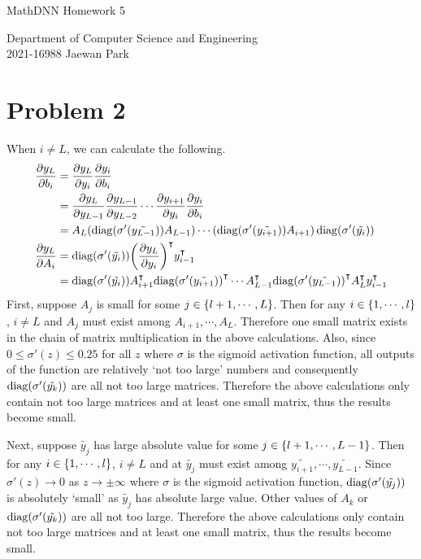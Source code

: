 \documentclass[10pt]{article}
\begin{document}
\begin{center}
    {\LARGE MathDNN Homework 5} \\
\end{center}
\begin{flushright}
    Department of Computer Science and Engineering \\
    2021-16988 Jaewan Park
\end{flushright}

\section*{Problem 2}
When $i \neq L$, we can calculate the following.
\begin{align*}
    \frac{\partial y_L}{\partial b_i} &= \frac{\partial y_L}{\partial y_i}\frac{\partial y_i}{\partial b_i} \\
    &= \frac{\partial y_L}{\partial y_{L-1}}\frac{\partial y_{L-1}}{\partial y_{L-2}}\cdots\frac{\partial y_{i+1}}{\partial y_i}\frac{\partial y_{i}}{\partial b_i} \\
    &= A_L\qty(\mathrm{diag}\qty(\sigma'(\tilde{y_{L-1}}))A_{L-1})\cdots\qty(\mathrm{diag}\qty(\sigma'(\tilde{y_{i+1}}))A_{i+1})\,\mathrm{diag}\qty(\sigma'(\tilde{y_i})) \\
    \frac{\partial y_L}{\partial A_i} &= \mathrm{diag}\qty(\sigma'(\tilde{y_i}))\qty(\frac{\partial y_L}{\partial y_i})^\intercal y_{i-1}^\intercal \\
    &= \mathrm{diag}\qty(\sigma'(\tilde{y_i}))A_{i+1}^\intercal\mathrm{diag}\qty(\sigma'(\tilde{y_{i+1}}))^\intercal\cdots A_{L-1}^\intercal\mathrm{diag}\qty(\sigma'\qty(\tilde{y_{L-1}}))^\intercal A_L^\intercal y_{i-1}^\intercal
\end{align*}
First, suppose $A_j$ is small for some $j \in \qty{l+1, \cdots , L}$.
Then for any $i \in \qty{1, \cdots , l}$, $i \neq L$ and $A_j$ must exist among $A_{i+1}, \cdots , A_L$.
Therefore one small matrix exists in the chain of matrix multiplication in the above calculations. 
Also, since $0 \leq \sigma'(z) \leq 0.25$ for all $z$ where $\sigma$ is the sigmoid activation function, all outputs of the function are relatively `not too large' numbers and consequently $\mathrm{diag}\qty(\sigma'\qty(\tilde{y_k}))$ are all not too large matrices.
Therefore the above calculations only contain not too large matrices and at least one small matrix, thus the results become small.

\vspace{3mm}
Next, suppose $\tilde{y_j}$ has large absolute value for some $j \in \qty{l+1, \cdots , L-1}$.
Then for any $i \in \qty{1, \cdots , l}$, $i \neq L$ and at $\tilde{y_j}$ must exist among $\tilde{y_{i+1}}, \cdots , \tilde{y_{L-1}}$.
Since $\sigma'(z) \to 0$ as $z \to \pm\infty$ where $\sigma$ is the sigmoid activation function, $\mathrm{diag}\qty(\sigma'\qty(\tilde{y_{j}}))$ is absolutely `small' as $\tilde{y_j}$ has absolute large value.
Other values of $A_k$ or $\mathrm{diag}\qty(\sigma'\qty(\tilde{y_k}))$ are all not too large.
Therefore the above calculations only contain not too large matrices and at least one small matrix, thus the results become small.
\end{document}
